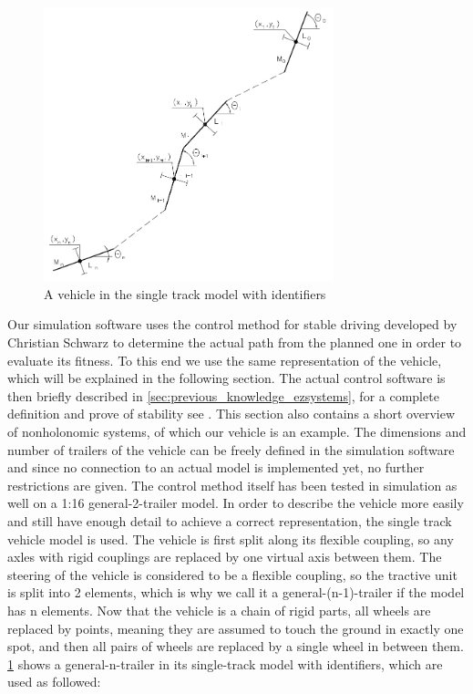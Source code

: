 \begin{figure}[t]
\centering
\includegraphics[width=0.75\textwidth]{./Chapters/Figures/single-track-model.png}
\caption{A vehicle in the single track model with identifiers\label{pic:single-track-model}}
\end{figure}

Our simulation software uses the control method for stable driving developed by Christian Schwarz to determine the actual path from the planned one in order to evaluate its fitness. To this end we use the same representation of the vehicle, which will be explained in the following section. The actual control software is then briefly described in \ref{sec:previous_knowledge_ezsystems}, for a complete definition and prove of stability see \cite{12}. This section also contains a short overview of nonholonomic systems, of which our vehicle is an example.
The dimensions and number of trailers of the vehicle can be freely defined in the simulation software and since no connection to an actual model is implemented yet, no further restrictions are given. The control method itself has been tested in simulation as well on a 1:16 general-2-trailer model. In order to describe the vehicle more easily and still have enough detail to achieve a correct representation, the single track vehicle model is used\cite{27}. The vehicle is first split along its flexible coupling, so any axles with rigid couplings are replaced by one virtual axis between them. The steering of the vehicle is considered to be a flexible coupling, so the tractive unit is split into 2 elements, which is why we call it a general-(n-1)-trailer if the model has n elements. Now that the vehicle is a chain of rigid parts, all wheels are replaced by points, meaning they are assumed to touch the ground in exactly one spot, and then all pairs of wheels are replaced by a single wheel in between them. \ref{pic:single-track-model} shows a general-n-trailer in its single-track model with identifiers, which are used as followed:

